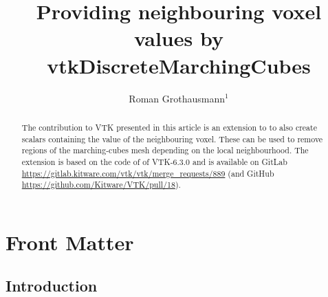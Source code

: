 \documentclass{InsightArticle}
\title{Providing neighbouring voxel values by vtkDiscreteMarchingCubes}
\author{Roman Grothausmann$^{1}$}
\newcommand{\IJhandlerIDnumber}{xxxx}
\begin{document}
%
%
\IJhandlefooter{\IJhandlerIDnumber}


\ifpdf
\else
\fi


\maketitle


\ifhtml
\chapter*{Front Matter\label{front}}
\fi


\begin{abstract}
\noindent
The contribution to VTK presented in this article is an extension to  to also create  scalars containing the value of the neighbouring voxel. These can be used to remove regions of the marching-cubes\citep{Lorensen1987} mesh depending on the local neighbourhood.
The extension is based on the code of  of VTK-6.3.0 and is available on GitLab \url{https://gitlab.kitware.com/vtk/vtk/merge_requests/889} (and GitHub \url{https://github.com/Kitware/VTK/pull/18}).
\end{abstract}

\IJhandlenote{\IJhandlerIDnumber}

\tableofcontents

\pagebreak

\section{Introduction}
\end{document}
